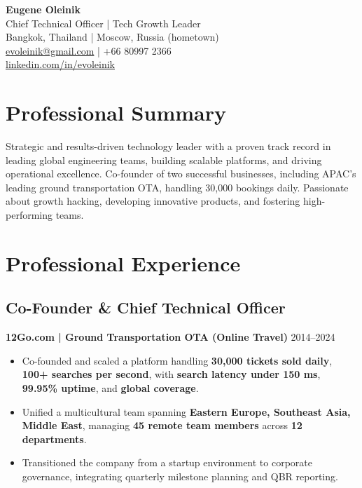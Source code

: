 \documentclass[11pt,a4paper]{article}
\begin{document}
\begin{center}
    {\Huge\textbf{Eugene Oleinik}} \\[0.3em]
    {\Large\color{secondarycolor} Chief Technical Officer | Tech Growth Leader} \\[0.5em]
    {\color{secondarycolor}
    Bangkok, Thailand | Moscow, Russia (hometown) \\[0.2em]
    \href{mailto:evoleinik@gmail.com}{evoleinik@gmail.com} | +66 80997 2366 \\[0.2em]
    \href{http://linkedin.com/in/evoleinik}{linkedin.com/in/evoleinik}}
\end{center}

\vspace{1em}

\section*{Professional Summary}
{
Strategic and results-driven technology leader with a proven track record in leading global engineering teams, building scalable platforms, and driving operational excellence. Co-founder of two successful businesses, including APAC's leading ground transportation OTA, handling 30,000 bookings daily. Passionate about growth hacking, developing innovative products, and fostering high-performing teams.}

\section*{Professional Experience}

\subsection*{Co-Founder \& Chief Technical Officer}
\textbf{12Go.com | Ground Transportation OTA (Online Travel)} \hfill 2014--2024
\begin{itemize}
    \item Co-founded and scaled a platform handling \textbf{30,000 tickets sold daily}, \textbf{100+ searches per second}, with \textbf{search latency under 150 ms}, \textbf{99.95\% uptime}, and \textbf{global coverage}.
    \item Unified a multicultural team spanning \textbf{Eastern Europe, Southeast Asia, Middle East}, managing \textbf{45 remote team members} across \textbf{12 departments}.
    \item Transitioned the company from a startup environment to corporate governance, integrating quarterly milestone planning and QBR reporting.
\end{itemize}
\end{document}
